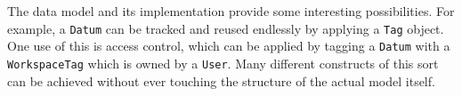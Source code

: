 The data model and its implementation provide some interesting possibilities.
For example, a {\tt Datum} can be tracked and reused endlessly by applying a {\tt Tag} object.
One use of this is access control, which can be applied by tagging a {\tt Datum} with a {\tt WorkspaceTag} which is owned by a {\tt User}.
Many different constructs of this sort can be achieved without ever touching the structure of the actual model itself.
